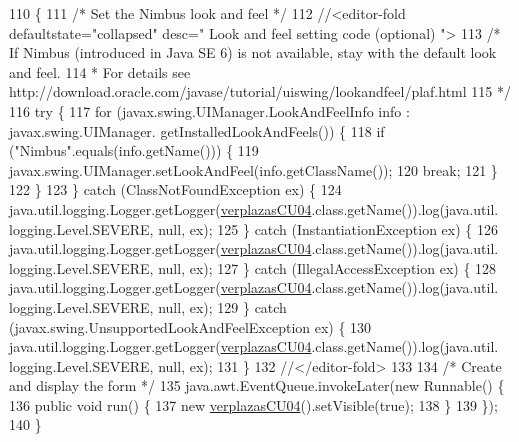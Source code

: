 \begin{DoxyCode}
110                                            \{
111         \textcolor{comment}{/* Set the Nimbus look and feel */}
112         \textcolor{comment}{//<editor-fold defaultstate="collapsed" desc=" Look and feel setting code (optional) ">}
113         \textcolor{comment}{/* If Nimbus (introduced in Java SE 6) is not available, stay with the default look and feel.}
114 \textcolor{comment}{         * For details see http://download.oracle.com/javase/tutorial/uiswing/lookandfeel/plaf.html }
115 \textcolor{comment}{         */}
116         \textcolor{keywordflow}{try} \{
117             \textcolor{keywordflow}{for} (javax.swing.UIManager.LookAndFeelInfo info : javax.swing.UIManager.
      getInstalledLookAndFeels()) \{
118                 \textcolor{keywordflow}{if} (\textcolor{stringliteral}{"Nimbus"}.equals(info.getName())) \{
119                     javax.swing.UIManager.setLookAndFeel(info.getClassName());
120                     \textcolor{keywordflow}{break};
121                 \}
122             \}
123         \} \textcolor{keywordflow}{catch} (ClassNotFoundException ex) \{
124             java.util.logging.Logger.getLogger(\mbox{\hyperlink{classinterfacessoguar_1_1verplazas_c_u04_a7c480282265a6a9b53792a7c6733f3f1}{verplazasCU04}}.class.getName()).log(java.util.
      logging.Level.SEVERE, null, ex);
125         \} \textcolor{keywordflow}{catch} (InstantiationException ex) \{
126             java.util.logging.Logger.getLogger(\mbox{\hyperlink{classinterfacessoguar_1_1verplazas_c_u04_a7c480282265a6a9b53792a7c6733f3f1}{verplazasCU04}}.class.getName()).log(java.util.
      logging.Level.SEVERE, null, ex);
127         \} \textcolor{keywordflow}{catch} (IllegalAccessException ex) \{
128             java.util.logging.Logger.getLogger(\mbox{\hyperlink{classinterfacessoguar_1_1verplazas_c_u04_a7c480282265a6a9b53792a7c6733f3f1}{verplazasCU04}}.class.getName()).log(java.util.
      logging.Level.SEVERE, null, ex);
129         \} \textcolor{keywordflow}{catch} (javax.swing.UnsupportedLookAndFeelException ex) \{
130             java.util.logging.Logger.getLogger(\mbox{\hyperlink{classinterfacessoguar_1_1verplazas_c_u04_a7c480282265a6a9b53792a7c6733f3f1}{verplazasCU04}}.class.getName()).log(java.util.
      logging.Level.SEVERE, null, ex);
131         \}
132         \textcolor{comment}{//</editor-fold>}
133 
134         \textcolor{comment}{/* Create and display the form */}
135         java.awt.EventQueue.invokeLater(\textcolor{keyword}{new} Runnable() \{
136             \textcolor{keyword}{public} \textcolor{keywordtype}{void} run() \{
137                 \textcolor{keyword}{new} \mbox{\hyperlink{classinterfacessoguar_1_1verplazas_c_u04_a7c480282265a6a9b53792a7c6733f3f1}{verplazasCU04}}().setVisible(\textcolor{keyword}{true});
138             \}
139         \});
140     \}
\end{DoxyCode}


